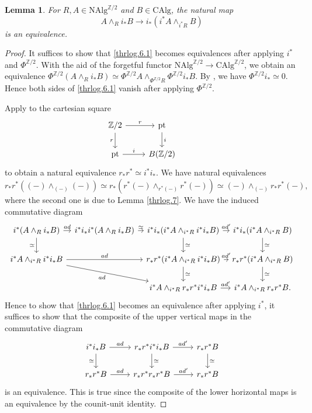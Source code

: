 \documentclass[10pt]{amsart}
\newtheorem{lem}[thm]{Lemma}
\theoremstyle{definition}
\theoremstyle{remark}
\numberwithin{equation}{section}
\newcommand{\CAlg}{\mathrm{CAlg}}
\newcommand{\NAlg}{\mathrm{NAlg}}
\newcommand{\pt}{\mathrm{pt}}
\newcommand{\Ztwo}{{\mathbb{Z}/2}}
\begin{document}
\begin{lem}
\label{thrlog.6}
For $R,A\in \NAlg^{\Ztwo}$ and $B\in \CAlg$,
the natural map
\begin{equation}
\label{thrlog.6.1}
A\wedge_R i_*B
\to
i_*(i^*A\wedge_{i^*R}B)
\end{equation}
is an equivalence.
\end{lem}
\begin{proof}
It suffices to show that \eqref{thrlog.6.1} becomes equivalences after applying $i^*$ and $\Phi^{\Ztwo}$.
With the aid of the forgetful functor $\NAlg^{\Ztwo}\to \CAlg^{\Ztwo}$, we obtain an equivalence $\Phi^{\Ztwo}(A\wedge_R i_*B)\simeq \Phi^{\Ztwo}A \wedge_{\Phi^{\Ztwo}R}\Phi^{\Ztwo}i_*B$.
By \cite[Proposition A.2.7(3),(5)]{THR},
we have $\Phi^{\Ztwo}i_*\simeq 0$.
Hence both sides of \eqref{thrlog.6.1} vanish after applying $\Phi^{\Ztwo}$.

Apply \cite[Proposition A.1.9]{THR} to the cartesian square
\[
\begin{tikzcd}
\Ztwo\ar[d,"r"']\ar[r,"r"]&
\pt\ar[d,"i"]&
\\
\pt\ar[r,"i"]&
B (\Ztwo)
\end{tikzcd}
\]
to obtain a natural equivalence $r_*r^*\simeq i^*i_*$.
We have natural equivalences
\[
r_*r^*((-)\wedge_{(-)} (-))
\simeq
r_*(r^*(-)\wedge_{r^*(-)}r^*(-))
\simeq 
(-)\wedge_{(-)}r_*r^*(-),
\]
where the second one is due to Lemma \ref{thrlog.7}.
We have the induced commutative diagram
\[
\begin{tikzcd}[column sep=tiny]
i^*(A\wedge_R i_*B)\ar[r,"ad"]\ar[d,"\simeq"']&
i^*i_*i^*(A\wedge_R i_*B)\ar[r,"\simeq"]&
i^*i_*(i^*A\wedge_{i^*R} i^*i_*B)\ar[r,"ad'"]\ar[d,"\simeq"]&
i^*i_*(i^*A\wedge_{i^*R} B)\ar[d,"\simeq"]
\\
i^*A\wedge_{i^*R}i^*i_*B\ar[rr,"ad"]\ar[rrd,"ad"']&
&
r_*r^*(i^*A\wedge_{i^*R}i^*i_*B)\ar[r,"ad'"]\ar[d,"\simeq"]&
r_*r^*(i^*A\wedge_{i^*R}B)\ar[d,"\simeq"]
\\
&
&
i^*A\wedge_{i^*R}r_*r^*i^*i_*B\ar[r,"ad'"]&
i^*A\wedge_{i^*R}r_*r^*B.
\end{tikzcd}
\]
Hence to show that \eqref{thrlog.6.1} becomes an equivalence after applying $i^*$, it suffices to show that the composite of the upper vertical maps in the commutative diagram
\[
\begin{tikzcd}
i^*i_*B\ar[r,"ad"]\ar[d,"\simeq"']&
r_*r^*i^*i_*B\ar[r,"ad'"]\ar[d,"\simeq"]&
r_*r^*B\ar[d,"\simeq"]
\\
r_*r^*B\ar[r,"ad"]&
r_*r^*r_*r^*B\ar[r,"ad'"]&
r_*r^*B
\end{tikzcd}
\]
is an equivalence.
This is true since the composite of the lower horizontal maps is an equivalence by the counit-unit identity.
\end{proof}
\end{document}
